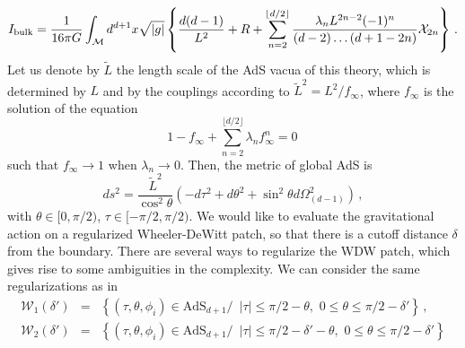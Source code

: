\documentclass[11pt,letterpaper]{article}
\begin{document}
\begin{equation}
I_{\rm bulk}=\frac{1}{16\pi G}\int_{\mathcal{M}}d^{d+1}x\sqrt{|g|}\left\{\frac{d(d-1)}{L^2}+R+\sum_{n=2}^{\lfloor d/2\rfloor}\frac{\lambda_n L^{2n-2}(-1)^{n}}{(d-2)\ldots(d+1-2n)}\mathcal{X}_{2n}\right\}\, .
\end{equation}
Let us denote by $\tilde L$ the length scale of the AdS vacua of this theory, which is determined by $L$ and by the couplings according to $\tilde L^2=L^2/f_{\infty}$, where $f_{\infty}$ is the solution of the equation
\begin{equation}
1-f_{\infty}+\sum_{n=2}^{\lfloor d/2\rfloor}\lambda_ nf_{\infty}^n=0\, 
\end{equation}
such that $f_{\infty}\rightarrow 1$ when $\lambda_n\rightarrow 0$.
Then, the metric of global AdS is
\begin{equation}\label{GAdS}
ds^2=\frac{\tilde L^2}{\cos^2\theta}\left(-d\tau^2+d\theta^2+\sin^2\theta d\Omega_{(d-1)}^2\right)\, ,
\end{equation}
with $\theta\in[0,\pi/2)$, $\tau\in[-\pi/2,\pi/2)$.
We would like to evaluate the gravitational action on a regularized Wheeler-DeWitt patch, so that there is a cutoff distance $\delta$ from the boundary. There are several ways to regularize the WDW patch, which gives rise to some ambiguities in the complexity. We can consider the same regularizations as in \cite{Carmi:2016wjl}
\begin{eqnarray}
\mathcal{W}_1(\delta')&=&\left\{(\tau, \theta, \phi_i)\in \text{AdS}_{d+1}/\, \, \, |\tau|\le \pi/2-\theta,\, \, 0\le\theta\le \pi/2-\delta'\right\}\, ,\\
\mathcal{W}_2(\delta')&=&\left\{(\tau, \theta, \phi_i)\in \text{AdS}_{d+1}/ \, \, \, |\tau|\le \pi/2-\delta'-\theta,\, \, 0\le\theta\le \pi/2-\delta'\right\}
\end{eqnarray}
\end{document}
